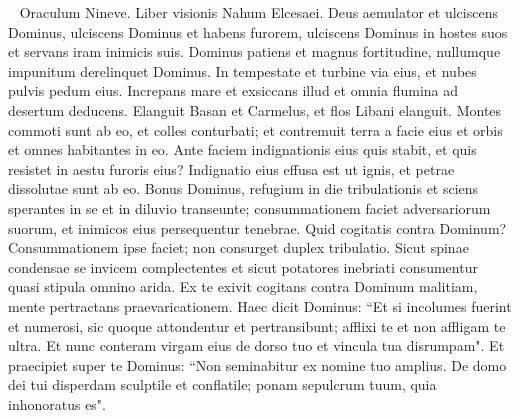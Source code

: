 
\begin{biblechapter}   
\verse Oraculum Nineve. Liber visionis Nahum Elcesaei. 
\verse Deus aemulator et ulciscens Dominus, ulciscens Dominus et habens furorem, ulciscens Dominus in hostes suos et servans iram inimicis suis. 
\verse Dominus patiens et magnus fortitudine, nullumque impunitum derelinquet Dominus. In tempestate et turbine via eius, et nubes pulvis pedum eius. 
\verse Increpans mare et exsiccans illud et omnia flumina ad desertum deducens. Elanguit Basan et Carmelus, et flos Libani elanguit. 
\verse Montes commoti sunt ab eo, et colles conturbati; et contremuit terra a facie eius et orbis et omnes habitantes in eo. 
\verse Ante faciem indignationis eius quis stabit, et quis resistet in aestu furoris eius? Indignatio eius effusa est ut ignis, et petrae dissolutae sunt ab eo. 
\verse Bonus Dominus, refugium in die tribulationis et sciens sperantes in se 
\verse et in diluvio transeunte; consummationem faciet adversariorum suorum, et inimicos eius persequentur tenebrae. 
\verse Quid cogitatis contra Dominum? Consummationem ipse faciet; non consurget duplex tribulatio. 
\verse Sicut spinae condensae se invicem complectentes et sicut potatores inebriati consumentur quasi stipula omnino arida. 
\verse Ex te exivit cogitans contra Dominum malitiam, mente pertractans praevaricationem. 
\verse Haec dicit Dominus: “Et si incolumes fuerint et numerosi, sic quoque attondentur et pertransibunt; afflixi te et non affligam te ultra. 
\verse Et nunc conteram virgam eius de dorso tuo et vincula tua disrumpam". 
\verse Et praecipiet super te Dominus: “Non seminabitur ex nomine tuo amplius. De domo dei tui disperdam sculptile et conflatile; ponam sepulcrum tuum, quia inhonoratus es". 
\end{biblechapter}

